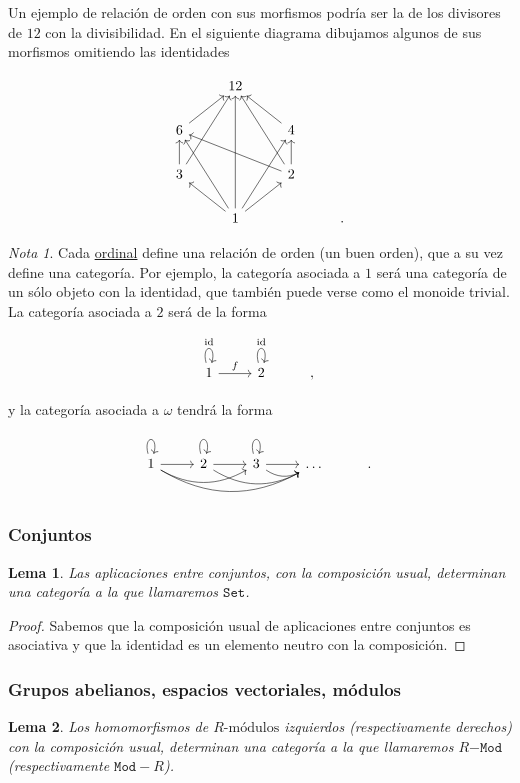 \documentclass[11pt]{article}
\theoremstyle{plain}
\newtheorem{lemma}{Lema}
\theoremstyle{definition}
\theoremstyle{remark}
\newtheorem*{remark}{Nota}
\begin{document}
Un ejemplo de relación de orden con sus morfismos podría ser la de
los divisores de \(12\) con la divisibilidad. En el siguiente diagrama
dibujamos algunos de sus morfismos omitiendo las identidades

\[\begin{tikzcd}
& 12 & \\
6 \urar & & 4 \ular \\
3 \ar{uur} \uar & & 2\uar\ar{ull}\ar{uul} \\
& 1 \ular\urar\ar{uuu}\ar{uur}\ar{uul} & &.
\end{tikzcd}\]

\begin{remark}
Cada \href{https://es.wikipedia.org/wiki/N\%25C3\%25BAmero\_ordinal\_(teor\%25C3\%25ADa\_de\_conjuntos)}{ordinal} define una relación de orden (un buen orden), que a su
vez define una categoría. Por ejemplo, la categoría asociada a \(1\)
será una categoría de un sólo objeto con la identidad, que también
puede verse como el monoide trivial. La categoría asociada a \(2\) será
de la forma

\[\begin{tikzcd}
1 \ar[loop above]{u}{\mathrm{id}} \rar{f} & 2 \ar[loop above]{u}{\mathrm{id}} &,
\end{tikzcd}\]

y la categoría asociada a \(\omega\) tendrá la forma

\[\begin{tikzcd}
1 \ar[loop above]{u} \rar \ar[bend right]{rr} \ar[bend right]{rrr} &
2 \ar[loop above]{u} \rar \ar[bend right]{rr} & 
3 \ar[loop above]{u} \rar \ar[bend right]{r} &
\dots & .
\end{tikzcd}\]
\end{remark}

\subsubsection{Conjuntos}
\label{sec:orgcb794da}
\begin{lemma}
Las aplicaciones entre conjuntos, con la composición usual, determinan
una categoría a la que llamaremos \(\mathtt{Set}\).
\end{lemma}

\begin{proof}
Sabemos que la composición usual de aplicaciones entre conjuntos es
asociativa y que la identidad es un elemento neutro con la composición.
\end{proof}

\subsubsection{Grupos abelianos, espacios vectoriales, módulos}
\label{sec:org072a0e2}
\begin{lemma}
Los homomorfismos de \(R\text{-módulos}\) izquierdos (respectivamente derechos)
con la composición usual, determinan una categoría a la que llamaremos
\(R\mathtt{-Mod}\) (respectivamente \(\mathtt{Mod-}R\)).
\end{lemma}
\end{document}
